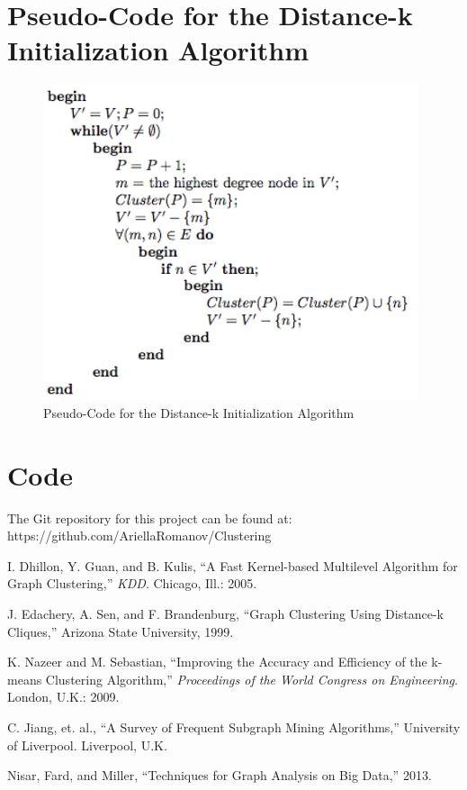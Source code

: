 \documentclass[12pt]{article}
\begin{document}
\newpage
\section{Pseudo-Code for the Distance-k Initialization Algorithm}
\label{appendix:distk_init}
\begin{figure}[!htb]
\begin{center}
	\includegraphics[height=25em]{distk_init}
	\caption{Pseudo-Code for the Distance-k Initialization Algorithm}
\end{center}
\end{figure}

\newpage
\section{Code}
\label{appendix:code}
The Git repository for this project can be found at:
\newline\newline
https://github.com/AriellaRomanov/Clustering

\newpage
\begin{thebibliography}{9}

I. Dhillon, Y. Guan, and B. Kulis, ``A Fast Kernel-based Multilevel Algorithm for Graph Clustering,'' \textit{KDD}. Chicago, Ill.: 2005.
 
J. Edachery, A. Sen, and F. Brandenburg, ``Graph Clustering Using Distance-k Cliques,'' Arizona State University, 1999.
 
K. Nazeer and M. Sebastian, ``Improving the Accuracy and Efficiency of the k-means Clustering Algorithm,'' 
\textit{Proceedings of the World Congress on Engineering}. London, U.K.: 2009.

C. Jiang, et. al., ``A Survey of Frequent Subgraph Mining Algorithms,'' University of Liverpool. Liverpool, U.K.

Nisar, Fard, and Miller, ``Techniques for Graph Analysis on Big Data,'' 2013.

\end{thebibliography}

\end{document}
